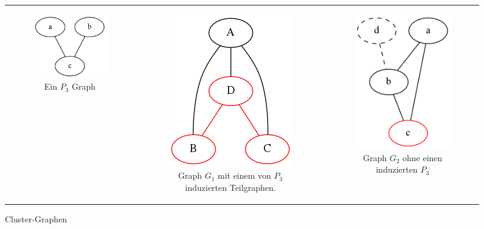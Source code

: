 \documentclass[12pt,a4paper,onecolumn,oneside,titlepage]{article}
\begin{document}
\begin{figure}
  \centering
 
  \begin{tabular}[c]{ccc}
    \begin{subfigure}[b]{0.32\textwidth}
      \includegraphics[scale=0.6]{dot/dot_mot_p3.png}
   
      \caption{Ein $P_3$ Graph }
      \label{fig:mot-p3}
   \end{subfigure}&
	 \begin{subfigure}[b]{0.32\textwidth}
	 \includegraphics[scale=0.5]{dot/dot_mot_1.png}
	 
	    \caption{Graph $G_1$ mit einem von $P_3$ induzierten Teilgraphen.}
	    \label{fig:mot-1}
	  \end{subfigure}&
    \begin{subfigure}[b]{0.32\textwidth}
       \includegraphics[scale=0.5]{dot/dot_explored_3.png}
	    \caption{Graph $G_2$ ohne einen induzierten $P_3$}
	    \label{fig:mot-2}
    \end{subfigure}
  \end{tabular}
  \caption{Cluster-Graphen}\label{fig:mot}
\end{figure}
\end{document}
